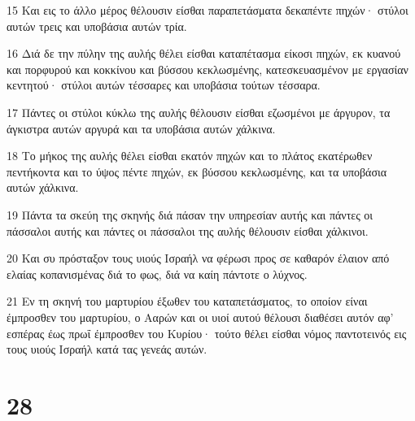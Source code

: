 \par 15 Και εις το άλλο μέρος θέλουσιν είσθαι παραπετάσματα δεκαπέντε πηχών· στύλοι αυτών τρεις και υποβάσια αυτών τρία.
\par 16 Διά δε την πύλην της αυλής θέλει είσθαι καταπέτασμα είκοσι πηχών, εκ κυανού και πορφυρού και κοκκίνου και βύσσου κεκλωσμένης, κατεσκευασμένον με εργασίαν κεντητού· στύλοι αυτών τέσσαρες και υποβάσια τούτων τέσσαρα.
\par 17 Πάντες οι στύλοι κύκλω της αυλής θέλουσιν είσθαι εζωσμένοι με άργυρον, τα άγκιστρα αυτών αργυρά και τα υποβάσια αυτών χάλκινα.
\par 18 Το μήκος της αυλής θέλει είσθαι εκατόν πηχών και το πλάτος εκατέρωθεν πεντήκοντα και το ύψος πέντε πηχών, εκ βύσσου κεκλωσμένης, και τα υποβάσια αυτών χάλκινα.
\par 19 Πάντα τα σκεύη της σκηνής διά πάσαν την υπηρεσίαν αυτής και πάντες οι πάσσαλοι αυτής και πάντες οι πάσσαλοι της αυλής θέλουσιν είσθαι χάλκινοι.
\par 20 Και συ πρόσταξον τους υιούς Ισραήλ να φέρωσι προς σε καθαρόν έλαιον από ελαίας κοπανισμένας διά το φως, διά να καίη πάντοτε ο λύχνος.
\par 21 Εν τη σκηνή του μαρτυρίου έξωθεν του καταπετάσματος, το οποίον είναι έμπροσθεν του μαρτυρίου, ο Ααρών και οι υιοί αυτού θέλουσι διαθέσει αυτόν αφ' εσπέρας έως πρωΐ έμπροσθεν του Κυρίου· τούτο θέλει είσθαι νόμος παντοτεινός εις τους υιούς Ισραήλ κατά τας γενεάς αυτών.

\chapter{28}

